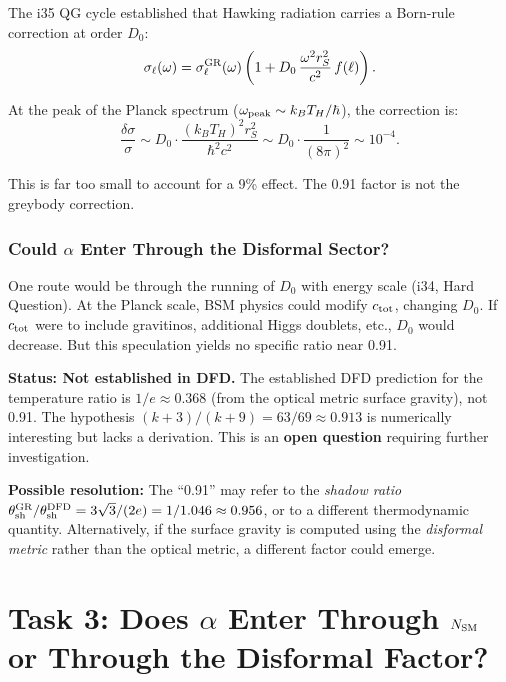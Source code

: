 \documentclass[11pt,a4paper]{article}
\begin{document}
The i35 QG cycle established that Hawking radiation carries a Born-rule correction at order $D_0$:
\begin{equation}
\sigma_\ell(\omega) = \sigma_\ell^{\rm GR}(\omega)\left(1 + D_0\,\frac{\omega^2 r_S^2}{c^2}\,f(\ell)\right).
\end{equation}

At the peak of the Planck spectrum ($\omega_{\rm peak} \sim k_B T_H/\hbar$), the correction is:
\begin{equation}
\frac{\delta\sigma}{\sigma} \sim D_0 \cdot \frac{(k_B T_H)^2 r_S^2}{\hbar^2 c^2} \sim D_0 \cdot \frac{1}{(8\pi)^2} \sim 10^{-4}.
\end{equation}

This is far too small to account for a 9\% effect. The 0.91 factor is not the greybody correction.

\subsubsection{Could $\alpha$ Enter Through the Disformal Sector?}

One route would be through the running of $D_0$ with energy scale (i34, Hard Question). At the Planck scale, BSM physics could modify $c_{\rm tot}$, changing $D_0$. If $c_{\rm tot}$ were to include gravitinos, additional Higgs doublets, etc., $D_0$ would decrease. But this speculation yields no specific ratio near 0.91.

\begin{tcolorbox}[colback=yellow!5!white, colframe=yellow!50!black, title=Assessment: The 0.91 Factor]
\textbf{Status: Not established in DFD.} The established DFD prediction for the temperature ratio is $1/e \approx 0.368$ (from the optical metric surface gravity), not 0.91. The hypothesis $(k+3)/(k+9) = 63/69 \approx 0.913$ is numerically interesting but lacks a derivation. This is an \textbf{open question} requiring further investigation.

\textbf{Possible resolution:} The ``0.91'' may refer to the \emph{shadow ratio} $\theta_{\rm sh}^{\rm GR}/\theta_{\rm sh}^{\rm DFD} = 3\sqrt{3}/(2e) = 1/1.046 \approx 0.956$, or to a different thermodynamic quantity. Alternatively, if the surface gravity is computed using the \emph{disformal metric} rather than the optical metric, a different factor could emerge.
\end{tcolorbox}


\section{Task 3: Does $\alpha$ Enter Through $N_{\rm SM}$ or Through the Disformal Factor?}
\label{sec:alpha-D0}
\end{document}
